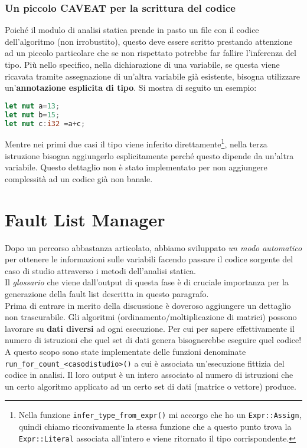 \subsubsection{Un piccolo CAVEAT per la scrittura del codice}
Poiché il modulo di analisi statica prende in pasto un file con il codice dell'algoritmo (non irrobustito), questo deve essere scritto prestando attenzione ad un piccolo particolare che se non rispettato potrebbe far fallire l'inferenza del tipo. Più nello specifico, nella dichiarazione di una variabile, se questa viene ricavata tramite assegnazione di un'altra variabile già esistente, bisogna utilizzare un'\textbf{annotazione esplicita di tipo}. Si mostra di seguito un esempio: 
\begin{lstlisting}[language=rust, style=boxed]
let mut a=13; 
let mut b=15; 
let mut c:i32 =a+c; 
\end{lstlisting}
Mentre nei primi due casi il tipo viene inferito direttamente\footnote{
    Nella funzione \texttt{infer\_type\_from\_expr()} mi accorgo che ho un \texttt{Expr::Assign}, quindi chiamo ricorsivamente la stessa funzione che a questo punto trova la \texttt{Expr::Literal} associata all'intero e viene ritornato il tipo corrispondente.
}, nella terza istruzione bisogna aggiungerlo esplicitamente perché questo dipende da un'altra variabile. Questo dettaglio non è stato implementato per non aggiungere complessità ad un codice già non banale.


\section{Fault List Manager}\label{sec:FLM}
Dopo un percorso abbastanza articolato, abbiamo sviluppato \textit{un modo automatico} per ottenere le informazioni sulle variabili facendo passare il codice sorgente del caso di studio attraverso i metodi dell'analisi statica. \\
Il \textit{glossario} che viene dall'output di questa fase è di cruciale importanza per la generazione della fault list descritta in questo paragrafo. \\
Prima di entrare in merito della discussione è doveroso aggiungere un dettaglio non trascurabile. Gli algoritmi (ordinamento/moltiplicazione di matrici) possono lavorare su \textbf{dati diversi} ad ogni esecuzione. Per cui per sapere effettivamente il numero di istruzioni che quel set di dati genera bisognerebbe eseguire quel codice! A questo scopo sono state implementate delle funzioni denominate \texttt{run\_for\_count\_<casodistudio>()} a cui è associata  un'esecuzione fittizia del codice in analisi. Il loro output è un intero associato al numero di istruzioni che un certo algoritmo applicato ad un certo set di dati (matrice o vettore) produce.\\

